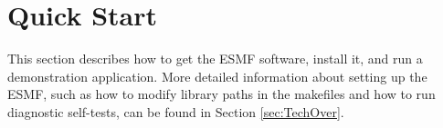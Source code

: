 \section{Quick Start}
\label{sec:QuickStart}

This section describes how to get the ESMF software, install it, 
and run a demonstration application.  More detailed information about 
setting up the ESMF, such as how to modify library paths in the 
makefiles and how to run diagnostic self-tests, can be found in 
Section \ref{sec:TechOver}.  






